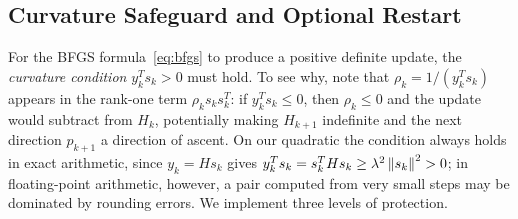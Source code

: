\subsection{Curvature Safeguard and Optional Restart}
\label{sec:restart}

\noindent For the BFGS formula~\eqref{eq:bfgs} to produce a positive definite
update, the \emph{curvature condition} $y_k^T s_k > 0$ must hold. To see why,
note that $\rho_k = 1/(y_k^T s_k)$ appears in the rank-one term
$\rho_k s_k s_k^T$: if $y_k^T s_k \leq 0$, then $\rho_k \leq 0$ and the update
would subtract from $H_k$, potentially making $H_{k+1}$ indefinite and the
next direction $p_{k+1}$ a direction of ascent. On our quadratic the condition
always holds in exact arithmetic, since $y_k = H s_k$ gives
$y_k^T s_k = s_k^T H s_k \geq \lambda^2 \left\|s_k\right\|^2 > 0$; in floating-point
arithmetic, however, a pair computed from very small steps may be dominated
by rounding errors. We implement three levels of protection.



